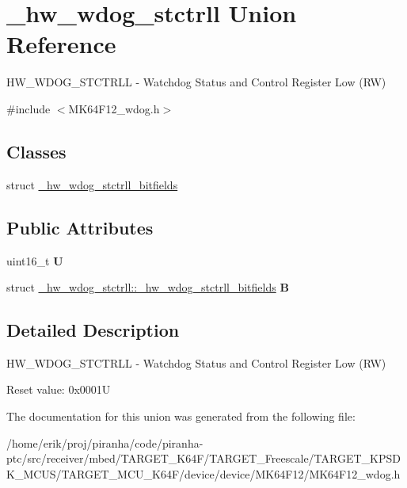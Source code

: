 \hypertarget{union__hw__wdog__stctrll}{}\section{\+\_\+hw\+\_\+wdog\+\_\+stctrll Union Reference}
\label{union__hw__wdog__stctrll}


H\+W\+\_\+\+W\+D\+O\+G\+\_\+\+S\+T\+C\+T\+R\+LL -\/ Watchdog Status and Control Register Low (RW)  




{\ttfamily \#include $<$M\+K64\+F12\+\_\+wdog.\+h$>$}

\subsection*{Classes}
\begin{DoxyCompactItemize}
\item 
struct \hyperlink{struct__hw__wdog__stctrll_1_1__hw__wdog__stctrll__bitfields}{\+\_\+hw\+\_\+wdog\+\_\+stctrll\+\_\+bitfields}
\end{DoxyCompactItemize}
\subsection*{Public Attributes}
\begin{DoxyCompactItemize}
\item 
uint16\+\_\+t {\bfseries U}\hypertarget{union__hw__wdog__stctrll_a2375bd6f152c0769613f8a3d6d8eff31}{}\label{union__hw__wdog__stctrll_a2375bd6f152c0769613f8a3d6d8eff31}

\item 
struct \hyperlink{struct__hw__wdog__stctrll_1_1__hw__wdog__stctrll__bitfields}{\+\_\+hw\+\_\+wdog\+\_\+stctrll\+::\+\_\+hw\+\_\+wdog\+\_\+stctrll\+\_\+bitfields} {\bfseries B}\hypertarget{union__hw__wdog__stctrll_a58b63a1b780c27ec2175e6031b4694a0}{}\label{union__hw__wdog__stctrll_a58b63a1b780c27ec2175e6031b4694a0}

\end{DoxyCompactItemize}


\subsection{Detailed Description}
H\+W\+\_\+\+W\+D\+O\+G\+\_\+\+S\+T\+C\+T\+R\+LL -\/ Watchdog Status and Control Register Low (RW) 

Reset value\+: 0x0001U 

The documentation for this union was generated from the following file\+:\begin{DoxyCompactItemize}
\item 
/home/erik/proj/piranha/code/piranha-\/ptc/src/receiver/mbed/\+T\+A\+R\+G\+E\+T\+\_\+\+K64\+F/\+T\+A\+R\+G\+E\+T\+\_\+\+Freescale/\+T\+A\+R\+G\+E\+T\+\_\+\+K\+P\+S\+D\+K\+\_\+\+M\+C\+U\+S/\+T\+A\+R\+G\+E\+T\+\_\+\+M\+C\+U\+\_\+\+K64\+F/device/device/\+M\+K64\+F12/M\+K64\+F12\+\_\+wdog.\+h\end{DoxyCompactItemize}
